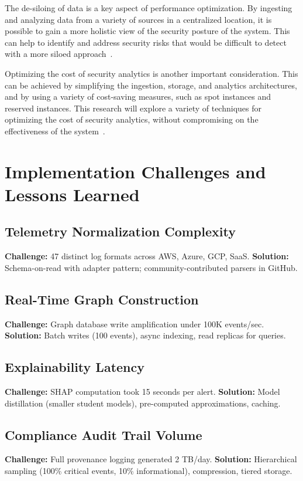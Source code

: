 The de-siloing of data is a key aspect of performance optimization. By ingesting and analyzing data from a variety of sources in a centralized location, it is possible to gain a more holistic view of the security posture of the system. This can help to identify and address security risks that would be difficult to detect with a more siloed approach~\cite{chaossearch2024desilo}.

Optimizing the cost of security analytics is another important consideration. This can be achieved by simplifying the ingestion, storage, and analytics architectures, and by using a variety of cost-saving measures, such as spot instances and reserved instances. This research will explore a variety of techniques for optimizing the cost of security analytics, without compromising on the effectiveness of the system~\cite{dremio2024optimization}.

\section{Implementation Challenges and Lessons Learned}\label{sec:arch-challenges}
\subsection{Telemetry Normalization Complexity}
\textbf{Challenge:} 47 distinct log formats across AWS, Azure, GCP, SaaS.
\textbf{Solution:} Schema-on-read with adapter pattern; community-contributed parsers in GitHub.

\subsection{Real-Time Graph Construction}
\textbf{Challenge:} Graph database write amplification under 100K events/sec.
\textbf{Solution:} Batch writes (100 events), async indexing, read replicas for queries.

\subsection{Explainability Latency}
\textbf{Challenge:} SHAP computation took 15 seconds per alert.
\textbf{Solution:} Model distillation (smaller student models), pre-computed approximations, caching.

\subsection{Compliance Audit Trail Volume}
\textbf{Challenge:} Full provenance logging generated 2 TB/day.
\textbf{Solution:} Hierarchical sampling (100\% critical events, 10\% informational), compression, tiered storage.

